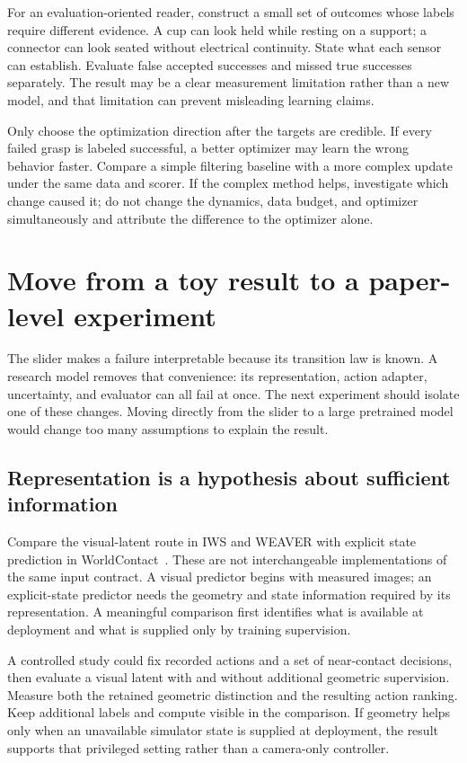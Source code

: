 For an evaluation-oriented reader, construct a small set of outcomes whose labels require different evidence. A cup can look held while resting on a support; a connector can look seated without electrical continuity. State what each sensor can establish. Evaluate false accepted successes and missed true successes separately. The result may be a clear measurement limitation rather than a new model, and that limitation can prevent misleading learning claims.

Only choose the optimization direction after the targets are credible. If every failed grasp is labeled successful, a better optimizer may learn the wrong behavior faster. Compare a simple filtering baseline with a more complex update under the same data and scorer. If the complex method helps, investigate which change caused it; do not change the dynamics, data budget, and optimizer simultaneously and attribute the difference to the optimizer alone.

\section{Move from a toy result to a paper-level experiment}
The slider makes a failure interpretable because its transition law is known. A research model removes that convenience: its representation, action adapter, uncertainty, and evaluator can all fail at once. The next experiment should isolate one of these changes. Moving directly from the slider to a large pretrained model would change too many assumptions to explain the result.

\subsection{Representation is a hypothesis about sufficient information}
Compare the visual-latent route in IWS and WEAVER with explicit state prediction in WorldContact~\citep{iws,weaver,worldcontact}. These are not interchangeable implementations of the same input contract. A visual predictor begins with measured images; an explicit-state predictor needs the geometry and state information required by its representation. A meaningful comparison first identifies what is available at deployment and what is supplied only by training supervision.

A controlled study could fix recorded actions and a set of near-contact decisions, then evaluate a visual latent with and without additional geometric supervision. Measure both the retained geometric distinction and the resulting action ranking. Keep additional labels and compute visible in the comparison. If geometry helps only when an unavailable simulator state is supplied at deployment, the result supports that privileged setting rather than a camera-only controller.

